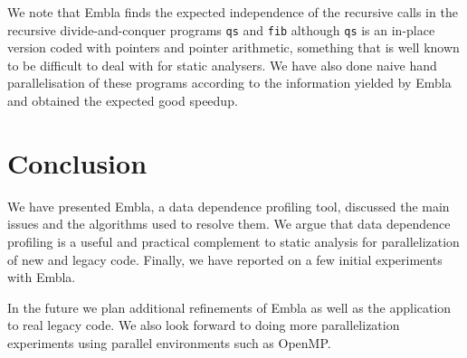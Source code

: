 \documentclass{acm_proc_article-sp}
\begin{document}
We note that Embla finds the expected independence of the recursive calls 
in the recursive divide-and-conquer programs {\tt qs} and
{\tt fib} although {\tt qs} is an in-place version coded 
with pointers and pointer arithmetic, something that is well known to be 
difficult to deal with for static analysers. We have also done naive
hand parallelisation of these programs according to the information 
yielded by Embla and obtained the expected good speedup.

\section{Conclusion}

We have presented Embla, a data dependence profiling tool, discussed the 
main issues and the algorithms used to resolve them. We argue that
data dependence profiling is a useful and practical complement to static
analysis for parallelization of new and legacy code. Finally, we have 
reported on a few initial experiments with Embla.

In the future we plan additional refinements of Embla as well as the 
application to real legacy code. We also look forward to doing more
parallelization experiments using parallel environments such as OpenMP.




\end{document}
